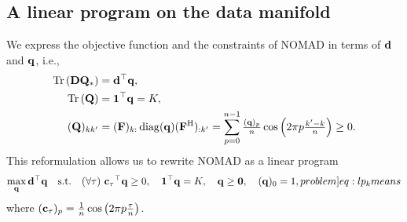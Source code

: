 \documentclass[twoside,11pt]{article}
\begin{document}


\subsection{A linear program on the data manifold}

We express the objective function and the constraints of NOMAD
in terms of ${\mathbf{d}}$ and ${\mathbf{q}}$, i.e.,
\begin{align}
	\operatorname{Tr}\left({\mathbf{D}} {\mathbf{Q}}_*\right) &= {{\mathbf{d}}}^\top {\mathbf{q}} , \\
	\operatorname{Tr}\left({\mathbf{Q}}\right) &= {{\mathbf{1}}}^\top {\mathbf{q}} = K , \\
	({\mathbf{Q}})_{kk'}
	&= ({\mathbf{F}})_{k:} \operatorname{diag}({\mathbf{q}}) ({{\mathbf{F}}}^\mathrm{H})_{:k'}
	= \sum_{p=0}^{n-1} \tfrac{({\mathbf{q}})_p}{n} \cos \left( 2\pi p \tfrac{k' - k}{n} \right) \geq 0 .
	\label{eq:lp_nneg}
\end{align}
This reformulation allows us to rewrite NOMAD as a linear program
\begin{equation}
	\max_{\vect{q}}
	\transpose{\vect{d}} \vect{q}
	\quad\text{s.t.}\quad
	(\forall \tau)\ \transpose{\vect{c}_\tau} \vect{q} \geq 0 ,
	\quad \transpose{\vect{1}} \vect{q} = K ,
	\quad \vect{q} \geq \vect{0},
	\quad (\vect{q})_0 = 1 ,
	\label[problem]{eq:lp_kmeans}
\end{equation}
where $({\mathbf{c}}_\tau)_p = \tfrac{1}{n} \cos \left( 2 \pi p \tfrac{\tau}{n} \right)$.
\end{document}
